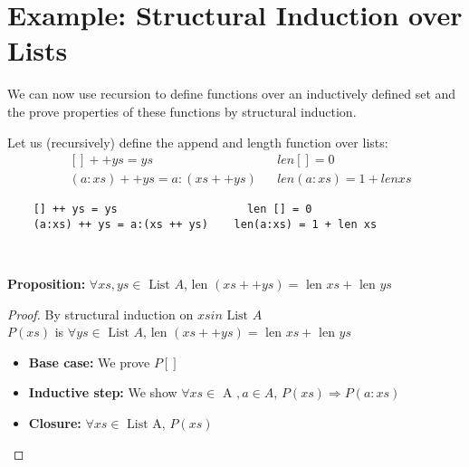 \section{Example: Structural Induction over Lists} %
\label{sec:example_structural_induction_over_lists}
We can now use recursion to define functions over an inductively defined set and the prove properties of these functions by structural induction.\\
\smallskip

Let us (recursively) define the append and length function over lists:
\begin{align*}
    &[] ++ ys = ys &&len [] = 0\\
    &(a:xs) ++ ys = a : (xs ++ ys) && len(a:xs) = 1 + len xs
\end{align*}
\begin{lstlisting}
    [] ++ ys = ys                    len [] = 0
    (a:xs) ++ ys = a:(xs ++ ys)    len(a:xs) = 1 + len xs
\end{lstlisting}\\
\smallskip

\noindent
\textbf{Proposition:} $\forall xs, ys \in \mbox{ List }A$, $\mbox{len }(xs ++ ys) =$ $\mbox{len } xs + \mbox{ len } ys$
\begin{proof}
    By structural induction on $xs in \mbox{ List }A$\\
    $P(xs)$ is $\forall ys \in \mbox{ List }A$, $\mbox{len }(xs ++ ys) =$ $\mbox{len } xs + \mbox{ len } ys$
    \begin{itemize}
        \item \textbf{Base case:} We prove $P[]$
        \item \textbf{Inductive step:} We show $\forall xs \in \mbox{ A }, a \in A$, $P(xs) \Rightarrow P(a:xs)$
        \item \textbf{Closure:} $\forall xs \in \mbox{ List A}$, $P(xs)$
    \end{itemize}
\end{proof}


